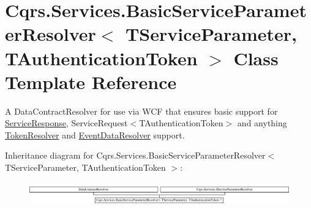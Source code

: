 \hypertarget{classCqrs_1_1Services_1_1BasicServiceParameterResolver}{}\section{Cqrs.\+Services.\+Basic\+Service\+Parameter\+Resolver$<$ T\+Service\+Parameter, T\+Authentication\+Token $>$ Class Template Reference}
\label{classCqrs_1_1Services_1_1BasicServiceParameterResolver}


A Data\+Contract\+Resolver for use via W\+CF that ensures basic support for \hyperlink{classCqrs_1_1Services_1_1ServiceResponse}{Service\+Response}, Service\+Request$<$\+T\+Authentication\+Token$>$ and anything \hyperlink{classCqrs_1_1Services_1_1BasicServiceParameterResolver_a0ed208048d0f925dfa1e14fb73d82f0b_a0ed208048d0f925dfa1e14fb73d82f0b}{Token\+Resolver} and \hyperlink{classCqrs_1_1Services_1_1BasicServiceParameterResolver_a49d548e272010a9047bac9671e5b1f70_a49d548e272010a9047bac9671e5b1f70}{Event\+Data\+Resolver} support.  


Inheritance diagram for Cqrs.\+Services.\+Basic\+Service\+Parameter\+Resolver$<$ T\+Service\+Parameter, T\+Authentication\+Token $>$\+:\begin{figure}[H]
\begin{center}
\leavevmode
\includegraphics[height=1.018182cm]{classCqrs_1_1Services_1_1BasicServiceParameterResolver}
\end{center}
\end{figure}
